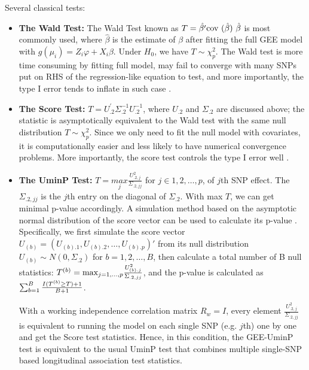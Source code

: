 \documentclass[compress]{beamer}
\begin{document}
{\framebreak
\scriptsize
Several classical tests:
\begin{itemize}
\item \textbf{The Wald Test:} The Wald Test known as $T=\hat{\beta'}\text{cov (\ensuremath{\hat{\beta}}) }\hat{\beta}$ is most commonly used, where $\hat{\beta}$ is the estimate of $\beta$ after fitting the full GEE model with $g(\mu_i) = Z_i\varphi + X_i \beta$. Under $H_0$, we have $T \sim \chi_{p}^2$. The Wald test is more time consuming by fitting full model, may fail to converge with many SNPs put on RHS of the regression-like equation to test, and more importantly, the type I error tends to inflate in such case \cite{pan2014powerful,zhang2014testing}.
\item \textbf{The Score Test:} $T=U_{.2}^{'}\Sigma_{.2}^{-1}U_{.2}^{-1}$, where $U_{.2}$ and $\Sigma_{.2}$ are discussed above; the statistic is asymptotically equivalent to the Wald test with the same null distribution $T \sim \chi_{p}^2$. Since we only need to fit the null model with covariates, it is computationally easier and less likely to have numerical convergence
problems. More importantly, the score test controls the type I error well \cite{pan2014powerful,zhang2014testing}.
\item \textbf{The UminP Test: }$T=\underset{j}{max}\frac{U_{.2,j}^{2}}{\Sigma_{.2,jj}}$
for $j\in 1,2,\dots,p$, of $j$th SNP effect. The $\Sigma_{.2,jj}$ is the $j$th entry on the diagonal of $\Sigma_{.2}$. With max $T$, we can get minimal p-value accordingly.
A simulation method based on the asymptotic normal distribution of
the score vector can be used to calculate its p-value \cite{pan2014powerful,zhang2014testing}. Specifically, we first simulate the score vector $U_{(b)} = ( U_{(b).1}, U_{(b).2},\ldots, U_{(b).p} )'$ from its null distribution  $U_{(b)} \sim N(0, \Sigma_{.2} )$ for $b = 1, 2, \ldots, B$, then calculate a total number of B null statistics: $T^{(b)} = \textrm{max}_{j = 1,\ldots,p} { U^2_{(b).j} \over  \Sigma_{.2,jj} }$, and the p-value is calculated as $\sum_{b=1}^B { I(T^{(b)} \geq T ) + 1  \over B + 1 } $.

With a working independence correlation matrix $R_w = I$, every element $\frac{U_{.2,j}^{2}}{\Sigma_{.2,jj}}$ is equivalent to running the model on each single SNP (e.g. $j$th) one by one and get the Score test statistics. Hence, in this condition, the GEE-UminP test is equivalent to the usual UminP test that combines multiple single-SNP based longitudinal association test statistics.
\end{itemize}
}
\end{document}
